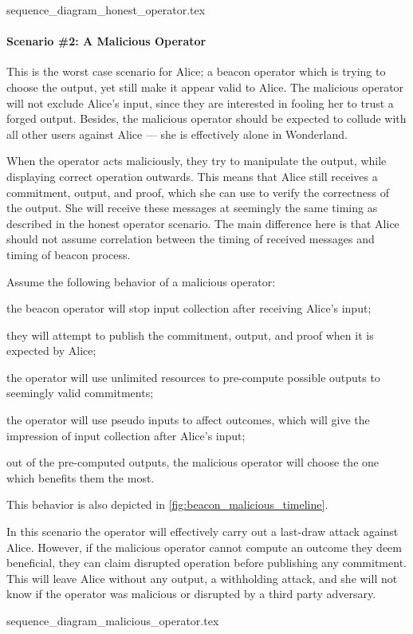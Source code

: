 {sequence_diagram_honest_operator.tex}

\paragraph{Scenario \#2: A Malicious Operator}
This is the worst case scenario for Alice; a beacon operator which is trying to choose the output, yet still make it appear valid to Alice.
The malicious operator will not exclude Alice's input, since they are interested in fooling her to trust a forged output.
Besides, the malicious operator should be expected to collude with all other users against Alice --- she is effectively alone in Wonderland.

When the operator acts maliciously, they try to manipulate the output, while displaying correct operation outwards.
This means that Alice still receives a commitment, output, and proof, which she can use to verify the correctness of the output.
She will receive these messages at seemingly the same timing as described in the honest operator scenario.
The main difference here is that Alice should not assume correlation between the timing of received messages and timing of beacon process.

Assume the following behavior of a malicious operator:
\begin{eletterate*}
\item the beacon operator will stop input collection after receiving Alice's input;
\item they will attempt to publish the commitment, output, and proof when it is expected by Alice;
\item the operator will use unlimited resources to pre-compute possible outputs to seemingly valid commitments;
\item the operator will use pseudo inputs to affect outcomes, which will give the impression of input collection after Alice's input;
\item out of the pre-computed outputs, the malicious operator will choose the one which benefits them the most.
\end{eletterate*}
This behavior is also depicted in \cref{fig:beacon_malicious_timeline}.

In this scenario the operator will effectively carry out a last-draw attack against Alice.
However, if the malicious operator cannot compute an outcome they deem beneficial, they can claim disrupted operation before publishing any commitment.
This will leave Alice without any output, a withholding attack, and she will not know if the operator was malicious or disrupted by a third party adversary.

{sequence_diagram_malicious_operator.tex}

